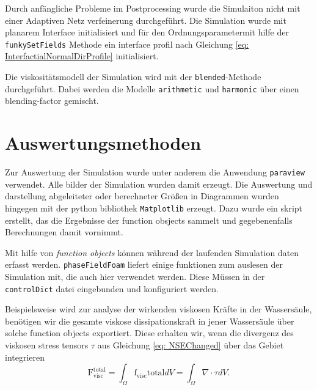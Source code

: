 Durch anfängliche Probleme im Postprocessing wurde die Simulaiton nicht mit einer Adaptiven Netz verfeinerung durchgeführt. 
Die Simulation wurde mit planarem Interface initialisiert und für den Ordnungsparametermit hilfe der \texttt{funkySetFields} Methode ein interface profil nach Gleichung \ref{eq: InterfactialNormalDirProfile} initialisiert. 

Die viskositätsmodell der Simulation wird mit der \texttt{blended}-Methode durchgeführt. Dabei werden die Modelle \texttt{arithmetic} und \texttt{harmonic} über einen blending-factor gemischt. 

\section{Auswertungsmethoden}
Zur Auswertung der Simulation wurde unter anderem die Anwendung \texttt{paraview} verwendet. Alle bilder der Simulation wurden damit erzeugt. Die Auswertung und darstellung abgeleiteter oder berechneter Größen in Diagrammen wurden hingegen mit der python bibliothek \texttt{Matplotlib} erzeugt. Dazu wurde ein skript erstellt, das die Ergebnisse der function obsjects sammelt und gegebenenfalls Berechnungen damit vornimmt. 

Mit hilfe von \textit{function objects} können während der laufenden Simulation daten erfasst werden. \texttt{phaseFieldFoam} liefert einige funktionen zum auslesen der Simulation mit, die auch hier verwendet werden. Diese Müssen in der \texttt{controlDict} datei eingebunden und konfiguriert werden. 

Beispielsweise wird zur analyse der wirkenden viskosen Kräfte in der Wassersäule, benötigen wir die gesamte viskose dissipationskraft in jener Wassersäule über solche function objects exportiert. Diese erhalten wir, wenn die divergenz des viskosen stress tensors $\tau$ aus Gleichung \ref{eq: NSEChanged} über das Gebiet integrieren
\begin{equation}
    \mathrm{F}_{\mathrm{visc}}^{\mathrm{total}} = \int_{\Omega} \mathrm{f}_{\mathrm{visc}}{\mathrm{total}} dV = \int_{\Omega} \nabla \cdot \tau dV.
\end{equation}

